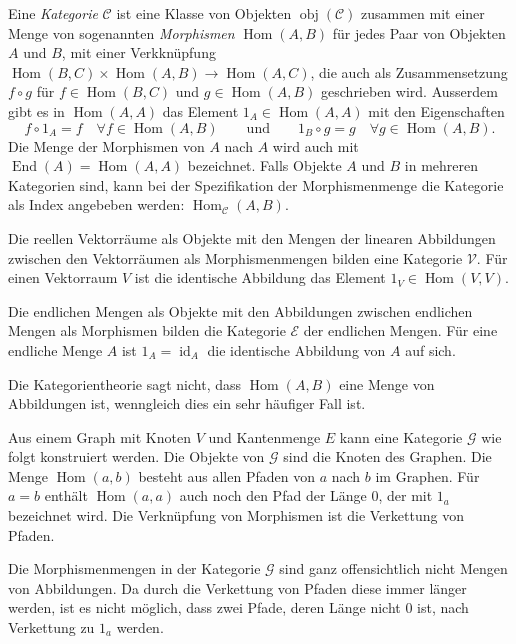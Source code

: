 \begin{definition}[Kategorie]
Eine {\em Kategorie} $\mathscr{C}$ ist eine Klasse von Objekten
$\operatorname{obj}(\mathscr{C})$ zusammen mit einer
Menge von sogenannten {\em Morphismen} $\operatorname{Hom}(A,B)$ für
jedes Paar von Objekten $A$ und $B$, mit einer Verkknüpfung
$
\operatorname{Hom}(B,C)\times \operatorname{Hom}(A,B)
\to
\operatorname{Hom}(A,C)
$, die auch als Zusammensetzung $f\circ g$ für $f\in \operatorname{Hom}(B,C)$
und $g\in \operatorname{Hom}(A,B)$ geschrieben wird.
Ausserdem gibt es in $\operatorname{Hom}(A,A)$ das Element
$1_A\in\operatorname{Hom}(A,A)$ mit den Eigenschaften
\[
f\circ 1_A = f\quad\forall f\in \operatorname{Hom}(A,B)
\qquad\text{und}\qquad
1_B\circ g = g\quad\forall g\in\operatorname{Hom}(A,B).
\]
Die Menge der Morphismen von $A$ nach $A$ wird auch mit
$\operatorname{End}(A)=\operatorname{Hom}(A,A)$ bezeichnet.
Falls Objekte $A$ und $B$ in mehreren Kategorien sind, kann bei der
Spezifikation der Morphismenmenge die Kategorie als Index
angebeben werden: $\operatorname{Hom}_{\mathscr{C}}(A,B)$.
\end{definition}

\begin{beispiel}
Die reellen Vektorräume als Objekte mit den Mengen der linearen
Abbildungen zwischen den Vektorräumen als Morphismenmengen bilden
eine Kategorie $\mathscr{V}$.
Für einen Vektorraum $V$ ist die identische Abbildung das Element
$1_V\in\operatorname{Hom}(V,V)$.
\end{beispiel}

\begin{beispiel}
Die endlichen Mengen als Objekte mit den Abbildungen zwischen
endlichen Mengen als Morphismen bilden die Kategorie $\mathscr{E}$
der endlichen Mengen.
Für eine endliche Menge $A$ ist $1_A=\operatorname{id}_A$ die
identische Abbildung von $A$ auf sich.
\end{beispiel}

Die Kategorientheorie sagt nicht, dass $\operatorname{Hom}(A,B)$
eine Menge von Abbildungen ist, wenngleich dies ein sehr häufiger
Fall ist.

\begin{beispiel}
Aus einem Graph mit Knoten $V$ und Kantenmenge $E$ kann eine Kategorie
$\mathscr{G}$ wie folgt konstruiert werden.
Die Objekte von $\mathscr{G}$ sind die Knoten des Graphen.
Die Menge $\operatorname{Hom}(a,b)$ besteht aus allen Pfaden
von $a$ nach $b$ im Graphen.
Für $a=b$ enthält $\operatorname{Hom}(a,a)$ auch noch den Pfad der
Länge $0$, der mit $1_a$ bezeichnet wird.
Die Verknüpfung von Morphismen ist die Verkettung von Pfaden.

Die Morphismenmengen in der Kategorie $\mathscr{G}$ sind ganz offensichtlich
nicht Mengen von Abbildungen.
Da durch die Verkettung von Pfaden diese immer länger werden, ist es
nicht möglich, dass zwei Pfade, deren Länge nicht $0$ ist, nach
Verkettung zu $1_a$ werden.
\end{beispiel}


